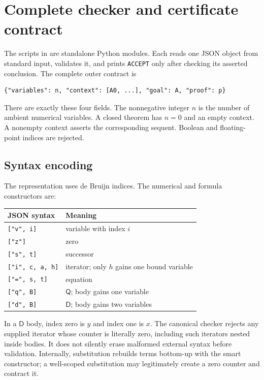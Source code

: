 \documentclass[11pt]{article}
\theoremstyle{definition}\newtheorem{definition}[theorem]{Definition}
\newcommand{\Q}{\mathsf Q}
\newcommand{\D}{\mathsf D}
\begin{document}
\section{Complete checker and certificate contract}
\label{sec:checker}

The scripts in  are standalone Python modules. Each reads
one JSON object from standard input, validates it, and prints
\texttt{ACCEPT} only after checking its asserted conclusion. The complete
outer contract is
\begin{lstlisting}[language={}]
{"variables": n, "context": [A0, ...], "goal": A, "proof": p}
\end{lstlisting}
There are exactly these four fields. The nonnegative integer $n$ is
the number of ambient numerical variables. A closed theorem has
$n=0$ and an empty context. A nonempty context asserts the corresponding
sequent. Boolean and floating-point indices are rejected.

\subsection{Syntax encoding}

The representation uses de Bruijn indices. The numerical and formula
constructors are:
\begin{center}
\begin{tabular}{@{}ll@{}}
\toprule
JSON syntax & Meaning\\
\midrule
\texttt{["v", i]} & variable with index $i$\\
\texttt{["z"]} & zero\\
\texttt{["s", t]} & successor\\
\texttt{["i", c, a, h]} & iterator; only $h$ gains one bound variable\\
\texttt{["=", s, t]} & equation\\
\texttt{["q", B]} & $\Q$; body gains one variable\\
\texttt{["d", B]} & $\D$; body gains two variables\\
\bottomrule
\end{tabular}
\end{center}
In a $\D$ body, index zero is $y$ and index one is $x$.
The canonical checker rejects any supplied iterator whose counter is
literally zero, including such iterators nested inside bodies. It does
not silently erase malformed external syntax before validation.
Internally, substitution rebuilds terms bottom-up with the smart
constructor; a well-scoped substitution may legitimately create a zero
counter and contract it.
\end{document}
